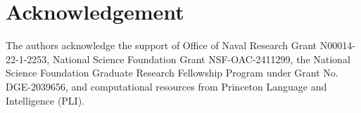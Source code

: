 \documentclass[11pt]{article}
\begin{document}
\nocite{*}








\section*{Acknowledgement}
The authors acknowledge the support of Office of Naval Research Grant N00014-22-1-2253, National Science Foundation Grant NSF-OAC-2411299, the National Science Foundation Graduate Research Fellowship Program under Grant No. DGE-2039656, and computational resources from Princeton Language and Intelligence (PLI). 



\clearpage
\appendix

\end{document}
